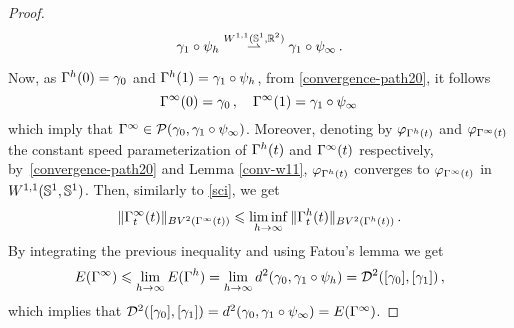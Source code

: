 \begin{proof}
 $$\gamma_1\circ\psi_h\overset{W^{1,1}(\mathbb{S}^1,\mathbb{R}^2)}{\rightharpoonup}\gamma_1\circ\psi_\infty\,.$$
\par Now, as $\Gamma^h(0)=\gamma_0$ and $\Gamma^h(1)= \gamma_1\circ \psi_h$, from \eqref{convergence-path20}, it follows 
 $$\Gamma^\infty(0) = \gamma_0\,,\quad \Gamma^\infty(1) = \gamma_1\circ\psi_\infty\,$$
which imply that $\Gamma^\infty\in \mathcal{P}(\gamma_0,\gamma_1\circ\psi_\infty)$. Moreover,  denoting  by $\varphi_{\Gamma^h(t)}$ and $ \varphi_{\Gamma^\infty(t)}$ the constant speed parameterization of $\Gamma^h(t)$ and $\Gamma^\infty(t)$ respectively, by~\eqref{convergence-path20} and Lemma \ref{conv-w11}, $\varphi_{\Gamma^h(t)}$ converges to $ \varphi_{\Gamma^\infty(t)}$ in $W^{1,1}(\mathbb{S}^1,\mathbb{S}^1)$. Then, similarly to \eqref{sci}, we get  
$$\| \Gamma^{\infty}_t(t)\|_{BV^2(\Gamma^\infty(t))} 
\leqslant \underset{h\rightarrow \infty}{\liminf} \, \|\Gamma^{h}_t(t)\|_{BV^2(\Gamma^h(t))}\,.
$$
By integrating the previous inequality and using Fatou's lemma we get 
$$E(\Gamma^\infty)\leqslant \lim_{h\rightarrow \infty} E(\Gamma^h)=\lim_{h\rightarrow \infty} d^2(\gamma_0,\gamma_1\circ\psi_h)=\mathcal{D}^2([\gamma_0] , [\gamma_1]) \,,$$
which implies that $\mathcal{D}^2([\gamma_0] , [\gamma_1]) = d^2(\gamma_0, \gamma_1 \circ \psi_\infty)=E(\Gamma^\infty)$.
\par 
\end{proof}


